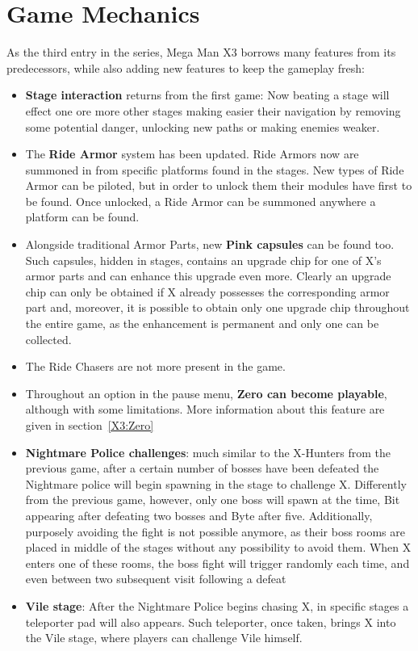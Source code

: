 \section{Game Mechanics}
As the third entry in the series, Mega Man X3 borrows many features from its predecessors, while also adding new features to keep the gameplay fresh:
\begin{itemize}
	\item \textbf{Stage interaction} returns from the first game: Now beating a stage will effect one ore more other stages making easier their navigation by removing some potential danger, unlocking new paths or making enemies weaker.
	\item The \textbf{Ride Armor} system has been updated. Ride Armors now are summoned in from specific platforms found in the stages. New types of Ride Armor can be piloted, but in order to unlock them their modules have first to be found. Once unlocked, a Ride Armor can be summoned anywhere a platform can be found.
	\item Alongside traditional Armor Parts, new \textbf{Pink capsules} can be found too. Such capsules, hidden in stages, contains an upgrade chip for one of X's armor parts and can enhance this upgrade even more. Clearly an upgrade chip can only be obtained if X already possesses the corresponding armor part and, moreover, it is possible to obtain only one upgrade chip throughout the entire game, as the enhancement is permanent and only one can be collected.
	\item The Ride Chasers are not more present in the game.
	\item Throughout an option in the pause menu, \textbf{Zero can become playable}, although with some limitations. More information about this feature are given in section~\ref{X3:Zero}
	\item \textbf{Nightmare Police challenges}: much similar to the X-Hunters from the previous game, after a certain number of bosses have been defeated the Nightmare police will begin spawning in the stage to challenge X. Differently from the previous game, however, only one boss will spawn at the time, Bit appearing after defeating two bosses and Byte after five. Additionally, purposely avoiding the fight is not possible anymore, as their boss rooms are placed in middle of the stages without any possibility to avoid them. When X enters one of these rooms, the boss fight will trigger randomly each time, and even between two subsequent visit following a defeat
	\item \textbf{Vile stage}: After the Nightmare Police begins chasing X, in specific stages a teleporter pad will also appears. Such teleporter, once taken, brings X into the Vile stage, where players can challenge Vile himself.
\end{itemize}
